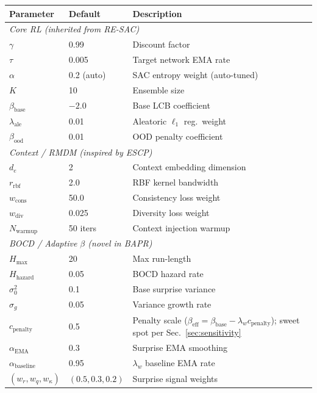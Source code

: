 \begin{center}
\begin{tabular}{lll}
\toprule
\textbf{Parameter} & \textbf{Default} & \textbf{Description} \\
\midrule
\multicolumn{3}{l}{\textit{Core RL (inherited from RE-SAC)}} \\
$\gamma$ & 0.99 & Discount factor \\
$\tau$ & 0.005 & Target network EMA rate \\
$\alpha$ & 0.2 (auto) & SAC entropy weight (auto-tuned) \\
$K$ & 10 & Ensemble size \\
$\beta_{\text{base}}$ & $-2.0$ & Base LCB coefficient \\
$\lambda_{\text{ale}}$ & 0.01 & Aleatoric $\ell_1$ reg.\ weight \\
$\beta_{\text{ood}}$ & 0.01 & OOD penalty coefficient \\
\midrule
\multicolumn{3}{l}{\textit{Context / RMDM (inspired by ESCP)}} \\
$d_e$ & 2 & Context embedding dimension \\
$r_{\text{rbf}}$ & 2.0 & RBF kernel bandwidth \\
$w_{\text{cons}}$ & 50.0 & Consistency loss weight \\
$w_{\text{div}}$ & 0.025 & Diversity loss weight \\
$N_{\text{warmup}}$ & 50 iters & Context injection warmup \\
\midrule
\multicolumn{3}{l}{\textit{BOCD / Adaptive $\beta$ (novel in BAPR)}} \\
$H_{\max}$ & 20 & Max run-length \\
$H_{\text{hazard}}$ & 0.05 & BOCD hazard rate \\
$\sigma_0^2$ & 0.1 & Base surprise variance \\
$\sigma_g$ & 0.05 & Variance growth rate \\
$c_{\text{penalty}}$ & 0.5 & Penalty scale ($\beta_{\text{eff}} = \beta_{\text{base}} - \lambda_w c_{\text{penalty}}$); sweet spot per Sec.~\ref{sec:sensitivity} \\
$\alpha_{\text{EMA}}$ & 0.3 & Surprise EMA smoothing \\
$\alpha_{\text{baseline}}$ & 0.95 & $\lambda_w$ baseline EMA rate \\
$(w_r, w_q, w_\kappa)$ & $(0.5, 0.3, 0.2)$ & Surprise signal weights \\
\bottomrule
\end{tabular}
\end{center}
